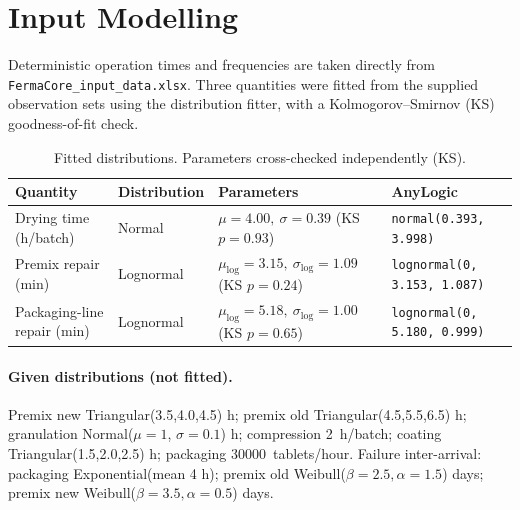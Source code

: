 \section{Input Modelling}
\label{sec:input}

Deterministic operation times and frequencies are taken directly from
\texttt{FermaCore\_input\_data.xlsx}. Three quantities were fitted from the
supplied observation sets using the distribution fitter, with a
Kolmogorov--Smirnov (KS) goodness-of-fit check.

\begin{table}[H]
\centering
\caption{Fitted distributions. Parameters cross-checked independently (KS).}
\label{tab:fits}
\begin{tabularx}{\textwidth}{l l l X}
\toprule
\textbf{Quantity} & \textbf{Distribution} & \textbf{Parameters} & \textbf{AnyLogic} \\
\midrule
Drying time (h/batch)        & Normal    & $\mu=4.00,\ \sigma=0.39$ (KS $p=0.93$) & \texttt{normal(0.393, 3.998)} \\
Premix repair (min)          & Lognormal & $\mu_{\log}=3.15,\ \sigma_{\log}=1.09$ (KS $p=0.24$) & \texttt{lognormal(0, 3.153, 1.087)} \\
Packaging-line repair (min)  & Lognormal & $\mu_{\log}=5.18,\ \sigma_{\log}=1.00$ (KS $p=0.65$) & \texttt{lognormal(0, 5.180, 0.999)} \\
\bottomrule
\end{tabularx}
\end{table}

\paragraph{Given distributions (not fitted).}
Premix new Triangular(3.5,4.0,4.5) h; premix old Triangular(4.5,5.5,6.5) h;
granulation Normal($\mu=1$, $\sigma=0.1$) h; compression \SI{2}{h}/batch;
coating Triangular(1.5,2.0,2.5) h; packaging \SI{30000}{tablets/hour}.
Failure inter-arrival: packaging Exponential(mean 4 h); premix old
Weibull($\beta{=}2.5,\alpha{=}1.5$) days; premix new Weibull($\beta{=}3.5,\alpha{=}0.5$) days.

